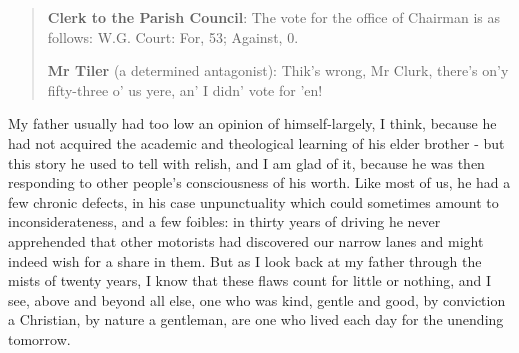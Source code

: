 \begin{quote}
\textbf{Clerk to the Parish Council}: The vote for the office of Chairman is as follows: W.G. Court: For, 53; Against, 0.

\textbf{Mr Tiler} (a determined antagonist): Thik’s wrong, Mr Clurk, there’s on’y fifty-three o’ us yere, an’ I didn' vote for ’en!
\end{quote}

My father usually had too low an opinion of himself-largely, I think, because he had not acquired the academic and theological learning of his elder brother - but this story he used to tell with relish, and I am glad of it, because he was then responding to other people's consciousness of his worth. Like most of us, he had a few chronic defects, in his case unpunctuality which could sometimes amount to inconsiderateness, and a few foibles: in thirty years of driving he never apprehended that other motorists had discovered our narrow lanes and might indeed wish for a share in them. But as I look back at my father through the mists of twenty years, I know that these flaws count for little or nothing, and I see, above and beyond all else, one who was kind, gentle and good, by conviction a Christian, by nature a gentleman, are one who lived each day for the unending tomorrow.